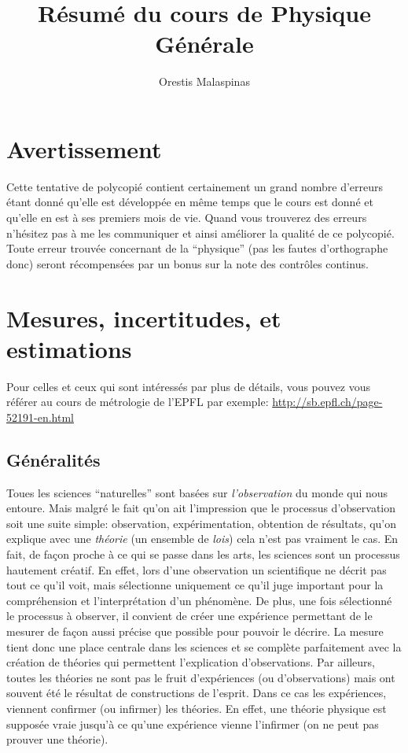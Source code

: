 \documentclass[a4paper,12pt]{book}
\title{Résumé du cours de Physique Générale}
\author{Orestis Malaspinas}
\begin{document}
\maketitle

\chapter*{Avertissement}

Cette tentative de polycopié contient certainement un grand nombre d'erreurs étant donné qu'elle est développée 
en même temps que le cours est donné et qu'elle en est à ses premiers mois de vie. 
Quand vous trouverez des erreurs n'hésitez pas à me les communiquer
et ainsi améliorer la qualité de ce polycopié. Toute erreur trouvée concernant de la ``physique'' (pas les fautes
d'orthographe donc) seront récompensées par un bonus sur la note des contrôles continus.

\chapter{Mesures, incertitudes, et estimations}

Pour celles et ceux qui sont intéressés par plus de détails, vous pouvez vous référer au cours de métrologie de l'EPFL par exemple: \url{http://sb.epfl.ch/page-52191-en.html}

\section{Généralités}

Toues les sciences ``naturelles'' sont basées sur \textit{l'observation} du monde qui nous entoure. 
Mais malgré le fait qu'on ait l'impression que le processus d’observation soit une suite simple:
observation, expérimentation, obtention de résultats, qu'on explique avec une \textit{théorie} (un ensemble de \textit{lois}) cela n'est pas vraiment le cas. En fait,
de façon proche à ce qui se passe dans les arts, les sciences sont un processus hautement créatif. 
En effet, lors d'une observation un scientifique ne décrit pas tout ce qu'il voit, 
mais sélectionne uniquement ce qu'il juge important
pour la compréhension et l'interprétation d'un phénomène. De plus, une fois sélectionné
le processus à observer, il convient de créer une expérience permettant de le mesurer de façon aussi précise que possible
pour pouvoir le décrire. La mesure tient donc une place centrale dans les sciences et se complète parfaitement avec la création de théories
qui permettent l'explication d'observations. Par ailleurs, toutes les théories ne sont pas le fruit
d'expériences (ou d'observations) mais ont souvent été le résultat de constructions de l'esprit. 
Dans ce cas les expériences, viennent confirmer (ou infirmer) les théories. En effet, une théorie physique est
supposée vraie jusqu'à ce qu'une expérience vienne l'infirmer (on ne peut pas prouver une théorie).
\end{document}
